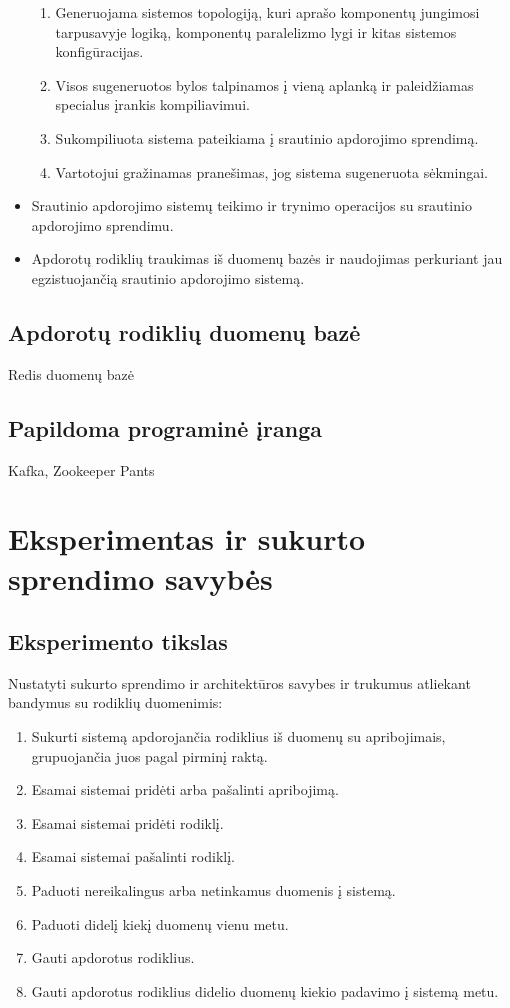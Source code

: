 \documentclass{VUMIFPSbakalaurinis}
\begin{document}
\begin{itemize}
\begin{enumerate}
        \item Generuojama sistemos topologiją, kuri aprašo komponentų jungimosi tarpusavyje logiką, komponentų paralelizmo lygi ir kitas sistemos konfigūracijas. 
        \item Visos sugeneruotos bylos talpinamos į vieną aplanką ir paleidžiamas specialus įrankis kompiliavimui.
        \item Sukompiliuota sistema pateikiama į srautinio apdorojimo sprendimą.
        \item Vartotojui gražinamas pranešimas, jog sistema sugeneruota sėkmingai.
    \end{enumerate}
    \item Srautinio apdorojimo sistemų teikimo ir trynimo operacijos su srautinio apdorojimo sprendimu.
    \item Apdorotų rodiklių traukimas iš duomenų bazės ir naudojimas perkuriant jau egzistuojančią srautinio apdorojimo sistemą.
\end{itemize}



\subsection{Apdorotų rodiklių duomenų bazė}

Redis duomenų bazė

\subsection{Papildoma programinė įranga}
Kafka, Zookeeper Pants

\section{Eksperimentas ir sukurto sprendimo savybės}

\subsection{Eksperimento tikslas}

Nustatyti sukurto sprendimo ir architektūros savybes ir trukumus atliekant bandymus su rodiklių duomenimis:
\begin{enumerate}
    \item Sukurti sistemą apdorojančia rodiklius iš duomenų su apribojimais, grupuojančia juos pagal pirminį raktą.
    \item Esamai sistemai pridėti arba pašalinti apribojimą.
    \item Esamai sistemai pridėti rodiklį.
    \item Esamai sistemai pašalinti rodiklį. 
    \item Paduoti nereikalingus arba netinkamus duomenis į sistemą.
    \item Paduoti didelį kiekį duomenų vienu metu.
    \item Gauti apdorotus rodiklius.
    \item Gauti apdorotus rodiklius didelio duomenų kiekio padavimo į sistemą metu.
\end{enumerate}
\end{document}
